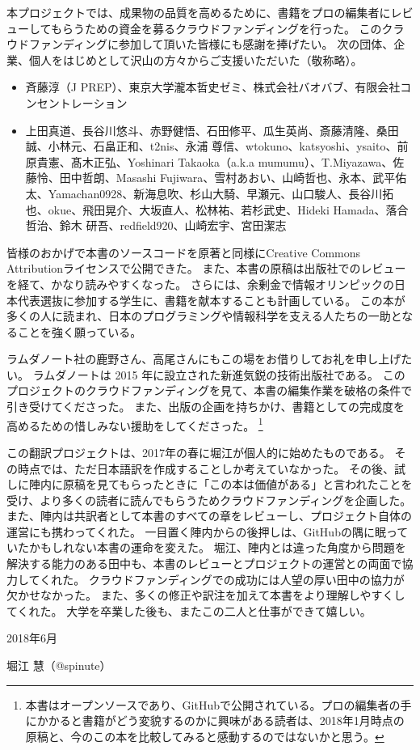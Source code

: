 本プロジェクトでは、成果物の品質を高めるために、書籍をプロの編集者にレビューしてもらうための資金を募るクラウドファンディングを行った。
このクラウドファンディングに参加して頂いた皆様にも感謝を捧げたい。
次の団体、企業、個人をはじめとして沢山の方々からご支援いただいた（敬称略）。 %
\begin{itemize}
\item 斉藤淳（J PREP）、東京大学瀧本哲史ゼミ、株式会社バオバブ、有限会社コンセントレーション
\item 上田真道、長谷川悠斗、赤野健悟、石田修平、瓜生英尚、斎藤清隆、桑田誠、小林元、石畠正和、t2nis、永浦 尊信、wtokuno、katsyoshi、ysaito、前原貴憲、髙木正弘、Yoshinari Takaoka（a.k.a mumumu）、T.Miyazawa、佐藤怜、田中哲朗、Masashi Fujiwara、雪村あおい、山崎哲也、永本、武平佑太、Yamachan0928、新海息吹、杉山大騎、早瀬元、山口駿人、長谷川拓也、okue、飛田晃介、大坂直人、松林祐、若杉武史、Hideki Hamada、落合哲治、鈴木 研吾、redfield920、山崎宏宇、宮田潔志
\end{itemize}

皆様のおかげで本書のソースコードを原著と同様にCreative Commons Attributionライセンスで公開できた。
また、本書の原稿は出版社でのレビューを経て、かなり読みやすくなった。
さらには、余剰金で情報オリンピックの日本代表選抜に参加する学生に、書籍を献本することも計画している。
この本が多くの人に読まれ、日本のプログラミングや情報科学を支える人たちの一助となることを強く願っている。

ラムダノート社の鹿野さん、高尾さんにもこの場をお借りしてお礼を申し上げたい。
ラムダノートは 2015 年に設立された新進気鋭の技術出版社である。
このプロジェクトのクラウドファンディングを見て、本書の編集作業を破格の条件で引き受けてくださった。
また、出版の企画を持ちかけ、書籍としての完成度を高めるための惜しみない援助をしてくださった。
\footnote{本書はオープンソースであり、GitHubで公開されている。プロの編集者の手にかかると書籍がどう変貌するのかに興味がある読者は、2018年1月時点の原稿と、今のこの本を比較してみると感動するのではないかと思う。}

この翻訳プロジェクトは、2017年の春に堀江が個人的に始めたものである。
その時点では、ただ日本語訳を作成することしか考えていなかった。
その後、試しに陣内に原稿を見てもらったときに「この本は価値がある」と言われたことを受け、より多くの読者に読んでもらうためクラウドファンディングを企画した。
また、陣内は共訳者として本書のすべての章をレビューし、プロジェクト自体の運営にも携わってくれた。
一目置く陣内からの後押しは、GitHubの隅に眠っていたかもしれない本書の運命を変えた。
堀江、陣内とは違った角度から問題を解決する能力のある田中も、本書のレビューとプロジェクトの運営との両面で協力してくれた。
クラウドファンディングでの成功には人望の厚い田中の協力が欠かせなかった。
また、多くの修正や訳注を加えて本書をより理解しやすくしてくれた。
大学を卒業した後も、またこの二人と仕事ができて嬉しい。

\noindent\hspace*{2em}
2018年6月

\hfill 堀江 慧（@spinute）
